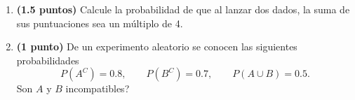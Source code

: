 
\begin{enumerate}[label=\alph*)]
\item \textbf{(1.5 puntos)} Calcule la probabilidad de que al lanzar dos dados, la suma de sus puntuaciones sea un múltiplo de 4.
\item \textbf{(1 punto)} De un experimento aleatorio se conocen las siguientes probabilidades
\[
P(A^C)=0.8,\qquad P(B^C)=0.7,\qquad P(A\cup B)=0.5.
\]
\textquestiondown{}Son $A$ y $B$ incompatibles?
\end{enumerate}
